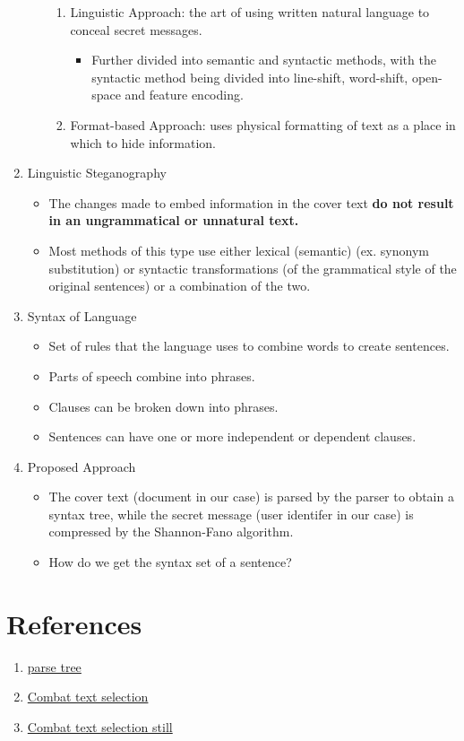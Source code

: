 \documentclass{article}
\begin{document}
\begin{enumerate}
\begin{itemize}
\begin{enumerate}
\item Linguistic Approach: the art of using written natural language to conceal secret messages.
\begin{itemize}
    \item Further divided into semantic and syntactic methods, with the syntactic method being divided into line-shift, word-shift, open-space and feature encoding.
\end{itemize}
\item Format-based Approach: uses physical formatting of text as a place in which to hide information.
\end{enumerate}
\end{itemize}
\item Linguistic Steganography
\begin{itemize}
\item The changes made to embed information in the cover text \textbf{do not result in an ungrammatical or unnatural text.}
\item Most methods of this type use either lexical (semantic) (ex. synonym substitution) or syntactic transformations (of the grammatical style of the original sentences) or a combination of the two.
\end{itemize}
\item Syntax of Language
\begin{itemize}
\item Set of rules that the language uses to combine words to create sentences.
\item Parts of speech combine into phrases.
\item Clauses can be broken down into phrases.
\item Sentences can have one or more independent or dependent clauses.
\end{itemize}
\item Proposed Approach
\begin{itemize}
\item The cover text (document in our case) is parsed by the parser to obtain a syntax tree, while the secret message (user identifer in our case) is compressed by the Shannon-Fano algorithm.
\item How do we get the syntax set of a sentence?
\end{itemize}
\end{enumerate}
\section{References}
\begin{enumerate}
    \item \href{https://stackoverflow.com/questions/42322902/how-to-get-parse-tree-using-python-nltk}{parse tree}
    \item \href{https://tex.stackexchange.com/questions/507288/minted-make-text-non-selectable-on-output-pdf}{Combat text selection}
    \item \href{https://stackoverflow.com/questions/28797418/replace-all-font-glyphs-in-a-pdf-by-converting-them-to-outline-shapes}{Combat text selection still}
\end{enumerate}
\end{document}
